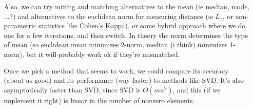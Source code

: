 \documentclass{article}
\begin{document}
Also, we can try mixing and matching alternatives to the mean (ie median, mode, ...?) and alternatives to the euclidean norm for measuring distance (ie $L_1$, or non-parametric statistics like Cohen's Kappa), or some hybrid approach where we do one for a few iterations, and then switch. In theory the norm determines the type of mean (so euclidean mean minimizes 2-norm, median (i think) minimizes 1-norm), but it will probably work ok if they're mismatched.

Once we pick a method that seems to work, we could compare its accuracy (about as good) and its performance (way faster) to methods like SVD. It's also asymptotically faster than SVD, since SVD is $O(mn^2)$, and this (if we implement it right) is linear in the number of nonzero elements.
\end{document}
